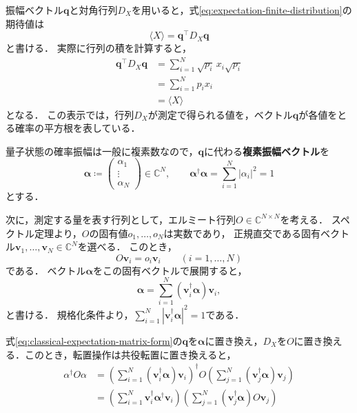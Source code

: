 振幅ベクトル$\bm{q}$と対角行列$D_X$を用いると，式\eqref{eq:expectation-finite-distribution}の期待値は
\begin{equation}
  \langle X\rangle=\bm{q}^\top D_X \bm{q}
  \label{eq:classical-expectation-matrix-form}
\end{equation}
と書ける．
実際に行列の積を計算すると，
\begin{equation*}
  \begin{aligned}
    \bm{q}^\top D_X \bm{q}
     & =\sum_{i=1}^{N}\sqrt{p_i}\,x_i\sqrt{p_i} \\
     & =\sum_{i=1}^{N}p_i x_i                   \\
     & =\langle X\rangle
  \end{aligned}
\end{equation*}
となる．
この表示では，行列$D_X$が測定で得られる値を，ベクトル$\bm{q}$が各値をとる確率の平方根を表している．

量子状態の確率振幅は一般に複素数なので，$\bm{q}$に代わる\textbf{複素振幅ベクトル}を
\begin{equation}
  \bm{\alpha}\coloneq
  \begin{pmatrix}\alpha_1\\\vdots\\\alpha_N\end{pmatrix}
  \in\mathbb C^N,
  \qquad
  \bm{\alpha}^{\dagger}\bm{\alpha}
  =\sum_{i=1}^{N}|\alpha_i|^2=1
  \label{eq:complex-amplitude-vector}
\end{equation}
とする．

次に，測定する量を表す行列として，エルミート行列$O\in\mathbb C^{N\times N}$を考える．
スペクトル定理より，$O$の固有値$o_1,\ldots,o_N$は実数であり，
正規直交である固有ベクトル$\bm{v}_1,\ldots,\bm{v}_N \in \mathbb C^N$を選べる．
このとき，
\begin{equation*}
  O\bm{v}_i=o_i\bm{v}_i
  \qquad(i=1,\ldots,N)
\end{equation*}
である．
ベクトル$\bm{\alpha}$をこの固有ベクトルで展開すると，
\begin{equation}
  \bm{\alpha}=\sum_{i=1}^{N} (\bm{v}_i^{\dagger}\bm{\alpha}) \bm{v}_i,
  \label{eq:state-in-observable-eigenbasis}
\end{equation}
と書ける．
規格化条件より，$\sum_{i=1}^{N}|\bm{v}_i^{\dagger}\bm{\alpha}|^2=1$である．

式\eqref{eq:classical-expectation-matrix-form}の$\bm{q}$を$\bm{\alpha}$に置き換え，$D_X$を$O$に置き換える．このとき，転置操作は共役転置に置き換えると，
\begin{align*}
  \alpha^{\dagger} O \alpha
   & = \left(\sum_{i=1}^{N} (\bm{v}_i^{\dagger}\bm{\alpha}) \bm{v}_i\right)^{\dagger}O
  \left(\sum_{j=1}^{N}(\bm{v}_j^{\dagger}\bm{\alpha})\bm{v}_j\right)                    \\
   & = \left(\sum_{i=1}^{N} \bm{v}_i^{\dagger} \bm{\alpha}^{\dagger} \bm{v}_i \right)
  \left(\sum_{j=1}^{N}(\bm{v}_j^{\dagger}\bm{\alpha})O\bm{v}_j\right)
\end{align*}

